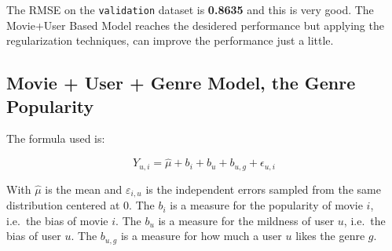 \documentclass[
]{article}
\begin{document}
The RMSE on the \texttt{validation} dataset is \textbf{0.8635} and this
is very good. The Movie+User Based Model reaches the desidered
performance but applying the regularization techniques, can improve the
performance just a little.

\hypertarget{movie-user-genre-model-the-genre-popularity}{%
\subsection{Movie + User + Genre Model, the Genre
Popularity}\label{movie-user-genre-model-the-genre-popularity}}

The formula used is:

\[Y_{u,i} = \hat{\mu} + b_i + b_u + b_{u,g} + \epsilon_{u,i}\]

With \(\hat{\mu}\) is the mean and \(\varepsilon_{i,u}\) is the
independent errors sampled from the same distribution centered at 0. The
\(b_i\) is a measure for the popularity of movie \(i\), i.e.~the bias of
movie \(i\). The \(b_u\) is a measure for the mildness of user \(u\),
i.e.~the bias of user \(u\). The \(b_{u,g}\) is a measure for how much a
user \(u\) likes the genre \(g\).
\end{document}

